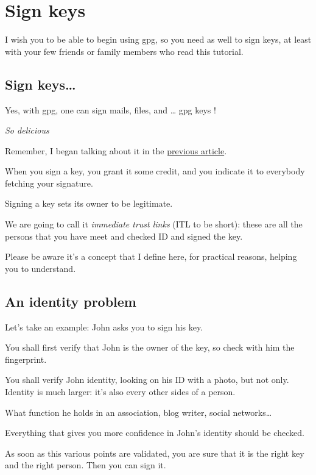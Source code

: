 \chapter{Sign keys}

I wish you to be able to begin using gpg, so you need as well to sign
keys, at least with your few friends or family members who read this
tutorial.

\section{Sign keys\ldots{}}\label{sign-keys}

Yes, with gpg, one can sign mails, files, and \ldots{} gpg keys !

\emph{So delicious}

Remember, I began talking about it in the \href{\{filename\}6-crypted-mail-en.md}{previous article}.

When you sign a key, you grant it some credit, and you indicate it to
everybody fetching your signature.

Signing a key sets its owner to be legitimate.

We are going to call it \emph{immediate trust links} (ITL to be short):
these are all the persons that you have meet and checked ID and signed
the key.

Please be aware it's a concept that I define here, for practical
reasons, helping you to understand.

\section{An identity problem}\label{an-identity-problem}

Let's take an example: John asks you to sign his key.

You shall first verify that John is the owner of the key, so check with
him the fingerprint.

You shall verify John identity, looking on his ID with a photo, but not
only. Identity is much larger: it's also every other sides of a person.

What function he holds in an association, blog writer, social
networks\ldots{}

Everything that gives you more confidence in John's identity should be
checked.

As soon as this various points are validated, you are sure that it is
the right key and the right person. Then you can sign it.

